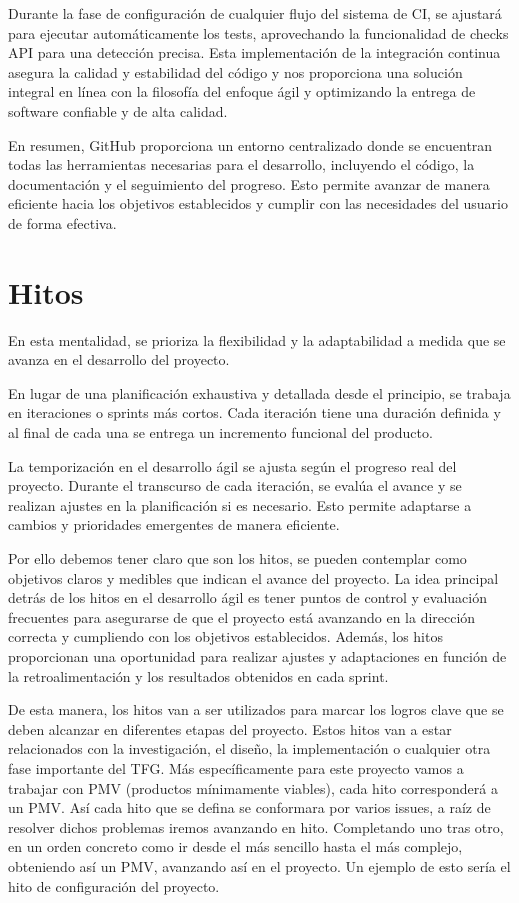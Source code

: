 Durante la fase de configuración de cualquier flujo del sistema de CI, se ajustará para ejecutar automáticamente los 
tests, aprovechando la funcionalidad de checks API para una detección precisa. Esta implementación de la integración 
continua asegura la calidad y estabilidad del código y nos proporciona una solución integral en línea con la filosofía 
del enfoque ágil y optimizando la entrega de software confiable y de alta calidad.

En resumen, GitHub proporciona un entorno centralizado donde se encuentran todas las herramientas necesarias para el desarrollo, incluyendo el código, la documentación y el seguimiento del progreso. Esto permite avanzar de manera eficiente hacia los objetivos establecidos y cumplir con las necesidades del usuario de forma efectiva.

\section{Hitos}

En esta mentalidad, se prioriza la flexibilidad y la adaptabilidad a medida que se avanza en el desarrollo del proyecto.

En lugar de una planificación exhaustiva y detallada desde el principio, se trabaja en iteraciones o sprints más cortos. Cada iteración tiene una duración definida y al final de cada una se entrega un incremento funcional del producto.

La temporización en el desarrollo ágil se ajusta según el progreso real del proyecto. Durante el transcurso de cada iteración, se evalúa el avance y se realizan ajustes en la planificación si es necesario. Esto permite adaptarse a cambios y prioridades emergentes de manera eficiente.

Por ello debemos tener claro que son los hitos, se pueden contemplar como objetivos claros y medibles que indican el avance del proyecto. La idea principal detrás de los hitos en el desarrollo ágil es tener puntos de control y evaluación frecuentes para asegurarse de que el proyecto está avanzando en la dirección correcta y cumpliendo con los objetivos establecidos. Además, los hitos proporcionan una oportunidad para realizar ajustes y adaptaciones en función de la retroalimentación y los resultados obtenidos en cada sprint. 

De esta manera, los hitos van a ser utilizados para marcar los logros clave que se deben alcanzar en diferentes etapas del proyecto. Estos hitos van a estar relacionados con la investigación, el diseño, la implementación o cualquier otra fase importante del TFG. Más específicamente para este proyecto vamos a trabajar con PMV (productos mínimamente viables), cada hito corresponderá a un PMV. Así cada hito que se defina se conformara por varios issues, a raíz de resolver dichos problemas iremos avanzando en hito. Completando uno tras otro, en un orden concreto como ir desde el más sencillo hasta el más complejo, obteniendo así un PMV, avanzando así en el proyecto. Un ejemplo de esto sería el hito de configuración del proyecto.

